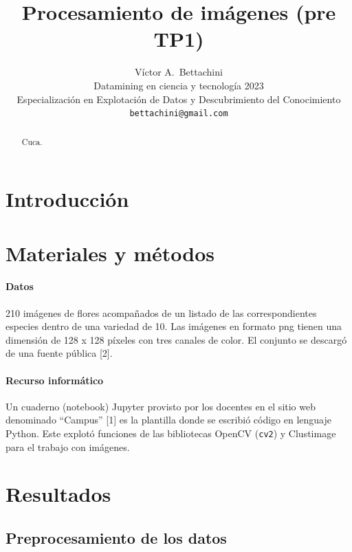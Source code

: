 \documentclass{article}
\title{Procesamiento de imágenes (pre TP1)}
\author{
  Víctor A.~Bettachini\\ %
  Datamining en ciencia y tecnología 2023\\
  Especialización en Explotación de Datos y Descubrimiento del Conocimiento\\
  \texttt{bettachini@gmail.com}
}
\begin{document}
\maketitle


\begin{abstract}
Cuca.
\end{abstract}


\section{Introducción}



\section{Materiales y métodos}

\paragraph{Datos}
210 imágenes de flores acompañados de un listado de las correspondientes especies dentro de una variedad de 10.
Las imágenes en formato png tienen una dimensión de 128 x 128 píxeles con tres canales de color.
El conjunto se descargó de una fuente pública [2].


\paragraph{Recurso informático} 
Un cuaderno (notebook) Jupyter provisto por los docentes en el sitio web denominado ``Campus'' [1] es la plantilla donde se escribió código en lenguaje Python.
Este explotó funciones de las bibliotecas OpenCV (\verb'cv2') y Clustimage para el trabajo con imágenes.


\section{Resultados}

\subsection{Preprocesamiento de los datos}

\end{document}
